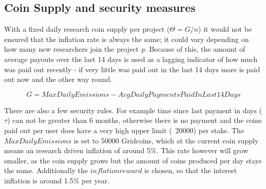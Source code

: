 \subsection{Coin Supply and security measures}

With a fixed daily research coin supply per project ($\Theta = G/n$) it would not be ensured that the inflation rate is always the same; it could vary depending on how many new researchers join the project \textit{p}. Because of this, the amount of average payouts over the last 14 days is used as a lagging indicator of how much was paid out recently - if very little was paid out in the last 14 days more is paid out now and the other way round.

\[ G = MaxDailyEmissions - AvgDailyPaymentsPaidInLast14Days \]

There are also a few security rules. For example time since last payment in days ($\tau$) can not be greater than 6 months, otherwise there is no payment and the coins paid out per user does have a very high upper limit (~20000) per stake.
The $MaxDailyEmissions$ is set to 50000 Gridcoins, which at the current coin supply means an research driven inflation of around 5\%. This rate however will grow smaller, as the coin supply grows but the amount of coins produced per day stays the same. Additionally the $inflationreward$ is chosen, so that the interest inflation is around 1.5\% per year.
